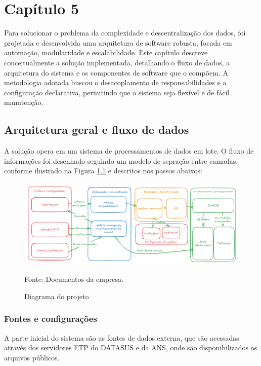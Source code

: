 \chapter{Capítulo 5}

Para solucionar o problema da complexidade e descentralização dos dados, foi projetada e desenvolvida uma arquitetura de software robusta, focada em automação, modularidade e escalabilidade. Este capítulo descreve conceitualmente a solução implementada, detalhando o fluxo de dados, a arquitetura do sistema e os componentes de software que o compõem. A metodologia adotada buscou o desacoplamento de responsabilidades e a configuração declarativa, permitindo que o sistema seja flexível e de fácil manutenção.

\section{Arquitetura geral e fluxo de dados}

A solução opera em um sistema de processamentos de dados em lote. O fluxo de informações foi desenhado seguindo um modelo de sepração entre camadas, conforme ilustrado na Figura \ref{fig:diagrama} e descritos nos passos abaixos: 

\begin{figure}[H]
  \centering
  \caption{Diagrama do projeto}\label{fig:diagrama}
  \includegraphics[width=1\linewidth]{imagens/diagrama.png}
  \par
  \footnotesize{Fonte: Documentos da empresa.}
\end{figure}

\subsection{Fontes e configurações}

A parte inicial do sistema são as fontes de dados externa, que são acessadas através dos servidores FTP do DATASUS e da ANS, onde são disponibilizados os arquivos públicos.

